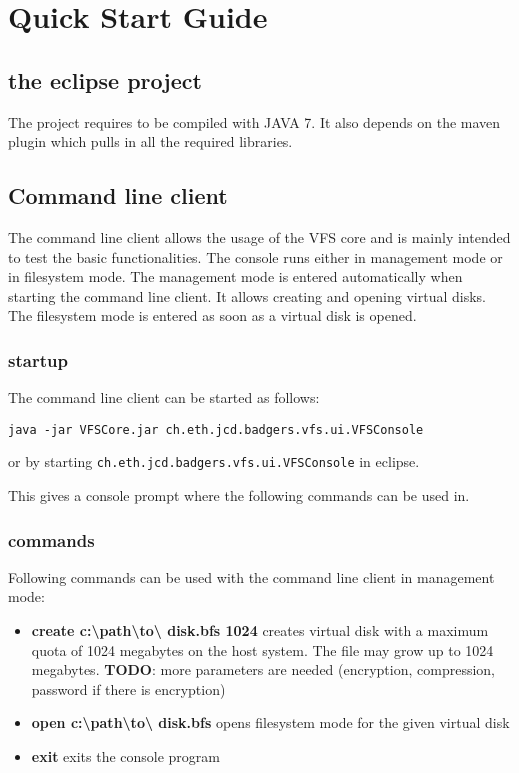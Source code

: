 

\section{Quick Start Guide}


\subsection{the eclipse project}
The project requires to be compiled with JAVA 7. It also depends on the maven
plugin which pulls in all the required libraries.

\subsection{Command line client}

The command line client allows the usage of the VFS core and is mainly intended
to test the basic functionalities. The console runs either in  management mode
or in filesystem mode. The management mode is entered automatically when
starting the command line client. It allows creating and opening virtual
disks. The filesystem mode is entered as soon as a virtual disk is opened.


\subsubsection{startup}
The command line client can be started as follows:

\begin{verbatim}
java -jar VFSCore.jar ch.eth.jcd.badgers.vfs.ui.VFSConsole
\end{verbatim}

or by starting \verb|ch.eth.jcd.badgers.vfs.ui.VFSConsole| in eclipse.



This gives a console prompt where the following commands can be used in.

\subsubsection{commands}
Following commands can be used with the command line client in management mode:

\begin{itemize}
  \item{\textbf{create c:\textbackslash path\textbackslash to\textbackslash
  disk.bfs 1024}} creates virtual disk with a maximum quota of 1024 megabytes on the host system. The file may grow up to 1024 megabytes.
  \textbf{TODO}: more parameters are needed (encryption, compression, password if there is encryption)
  \item {\textbf{open c:\textbackslash path\textbackslash to\textbackslash
  disk.bfs}} opens filesystem mode for the given virtual disk
  \item {\textbf{exit}} exits the console program
\end{itemize}

